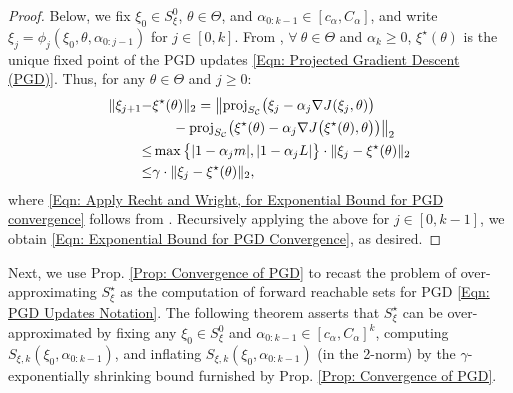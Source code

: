 \documentclass[letterpaper, 10 pt, conference]{ieeeconf}
\newcommand{\?}{\stackrel{?}{=}}
\newcommand{\obj}{J}
\newcommand{\param}{\theta}
\newcommand{\paramSet}{\Theta}
\newcommand{\var}{\xi}
\newcommand{\varMap}{\phi}
\newcommand{\varOpt}{\var^\star}
\newcommand{\varOptSet}{S_\var^\star}
\newcommand{\smoothnessConstant}{L}
\newcommand{\strongConvexityConstant}{m}
\newcommand{\ratePGD}{\alpha}
\newcommand{\ratePGDMin}{c_\ratePGD}
\newcommand{\ratePGDMax}{C_\ratePGD}
\newcommand{\convergenceRatePGD}{\gamma}
\newcommand{\proj}{\text{proj}}
\newcommand{\constraintSet}{{S_{\mathcal{C}}}}
\newcommand{\varInitialSet}{S_\var^0}
\newcommand{\varForwardReachableSet}[1]{S_{\var, {#1}}}
\newcommand{\frank}[1]{{\textcolor[rgb]{0,0,1}{\textsf{[Frank: {#1}]}}}}
\newcommand{\antoine}[1]{{\textcolor[rgb]{1,0,0}{\textsf{[Antoine: {#1}]}}}}
\begin{document}
\begin{proof}
Below, we fix $\var_0 \in \varInitialSet$, $\param \in \paramSet$, and $\ratePGD_{0:k-1} \in [\ratePGDMin, \ratePGDMax]$, and write $\var_j = \varMap_j(\var_0, \param, \ratePGD_{0:j-1})$ for $j \in [0, k]$.
From \cite[Prop. 7.8]{WrightRecht2022OptimizationForDataAnalysis}, $\forall \ \param \in \paramSet$ and $\ratePGD_k \geq 0$, $\varOpt(\param)$ is the unique fixed point of the PGD updates \eqref{Eqn: Projected Gradient Descent (PGD)}. Thus, for any $\param \in \paramSet$ and $j \geq 0$:
\begin{align} \nonumber
    \Vert \var_{j+1} -  &\varOpt(\param) \Vert_2  = \big\Vert \proj_\constraintSet\big(\var_j - \ratePGD_j \nabla \obj(\var_j, \param) \big) \\ \nonumber
    &\hspace{5mm} - \proj_\constraintSet\big(\varOpt(\param) - \ratePGD_j \nabla \obj\big(\varOpt(\param), \param \big) \big) \big\Vert_2 \\
    \label{Eqn: Apply Recht and Wright, for Exponential Bound for PGD convergence}
    \leq &\max\big\{ |1 - \ratePGD_j \strongConvexityConstant|, |1 - \ratePGD_j \smoothnessConstant| \big\} \cdot \Vert \var_j - \varOpt(\param) \Vert_2 \\ \nonumber
    \leq &\convergenceRatePGD \cdot \Vert \var_j - \varOpt(\param) \Vert_2,
\end{align}
where \eqref{Eqn: Apply Recht and Wright, for Exponential Bound for PGD convergence} follows from \cite[Eqn. (7.8)]{WrightRecht2022OptimizationForDataAnalysis}. Recursively applying the above for $j \in [0, k-1]$, we obtain \eqref{Eqn: Exponential Bound for PGD Convergence}, as desired.
\end{proof}


Next, we use Prop. \ref{Prop: Convergence of PGD} to recast the problem of over-approximating $\varOptSet$ as the computation of forward reachable sets for PGD \eqref{Eqn: PGD Updates Notation}.
The following theorem asserts that $\varOptSet$ can be over-approximated by fixing any $\var_0 \in \varInitialSet$ and $\ratePGD_{0:k-1} \in [\ratePGDMin, \ratePGDMax]^k$, computing $\varForwardReachableSet{k}(\var_0, \ratePGD_{0:k-1})$, and inflating $\varForwardReachableSet{k}(\var_0, \ratePGD_{0:k-1})$ (in the 2-norm) by the $\convergenceRatePGD$-exponentially shrinking bound furnished by Prop. \ref{Prop: Convergence of PGD}.
\end{document}
